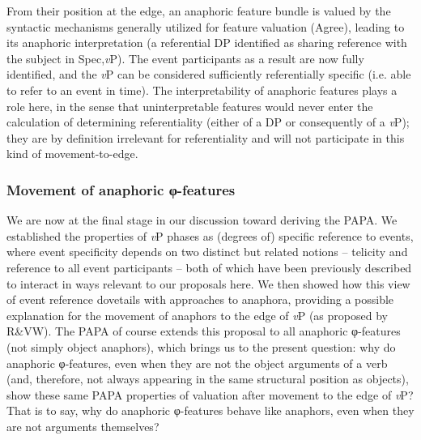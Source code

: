 \documentclass[output=paper
,modfonts
,nonflat
]{langsci/langscibook}
\begin{document}
From their position at the edge, an anaphoric feature bundle is valued by the syntactic mechanisms generally utilized for feature valuation (Agree), leading to its anaphoric interpretation (a referential DP identified as sharing reference with the subject in Spec,\textit{v}P). The event participants as a result are now fully identified, and the \textit{v}P can be considered sufficiently referentially specific (i.e. able to refer to an event in time). The interpretability of anaphoric features plays a role here, in the sense that uninterpretable features would never enter the calculation of determining referentiality (either of a DP or consequently of a \textit{v}P); they are by definition irrelevant for referentiality and will not participate in this kind of movement-to-edge.

\subsubsection{Movement of anaphoric φ-features}

We are now at the final stage in our discussion toward deriving the PAPA. We established the properties of \textit{v}P phases as (degrees of) specific reference to events, where event specificity depends on two distinct but related notions -- telicity and reference to all event participants -- both of which have been previously described to interact in ways relevant to our proposals here. We then showed how this view of event reference dovetails with approaches to anaphora, providing a possible explanation for the movement of anaphors to the edge of \textit{v}P (as proposed by R\&VW). The PAPA of course extends this proposal to all anaphoric φ-features (not simply object anaphors), which brings us to the present question: why do anaphoric φ-features, even when they are not the object arguments of a verb (and, therefore, not always appearing in the same structural position as objects), show these same PAPA properties of valuation after movement to the edge of \textit{v}P?  That is to say, why do anaphoric φ-features behave like anaphors, even when they are not arguments themselves?\largerpage[1.75]
\end{document}

